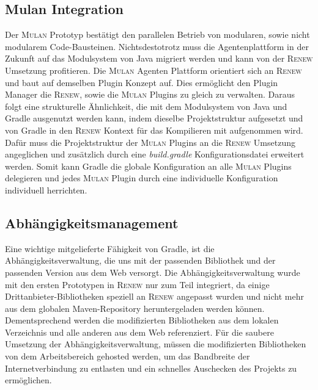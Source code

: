  \subsection*{Mulan Integration}
	Der \textsc{Mulan} Prototyp bestätigt den parallelen Betrieb von modularen, sowie nicht modularem Code-Bausteinen. Nichtsdestotrotz muss die Agentenplattform in der Zukunft auf das Modulsystem von Java migriert werden und kann von der \textsc{Renew} Umsetzung profitieren.\newline
	Die \textsc{Mulan} Agenten Plattform orientiert sich an \textsc{Renew} und baut auf demselben Plugin Konzept auf. Dies ermöglicht den Plugin Manager die \textsc{Renew}, sowie die \textsc{Mulan} Plugins zu gleich zu verwalten. Daraus folgt eine strukturelle Ähnlichkeit, die mit dem Modulsystem von Java und Gradle ausgenutzt werden kann, indem dieselbe Projektstruktur aufgesetzt und von Gradle in den \textsc{Renew} Kontext für das Kompilieren mit aufgenommen wird.\newline
	Dafür muss die Projektstruktur der \textsc{Mulan} Plugins an die \textsc{Renew} Umsetzung angeglichen und zusätzlich durch eine \textit{build.gradle} Konfigurationsdatei erweitert werden. Somit kann Gradle die globale Konfiguration an alle \textsc{Mulan} Plugins delegieren und jedes \textsc{Mulan} Plugin durch eine individuelle Konfiguration individuell herrichten. 
		
 \subsection*{Abhängigkeitsmanagement}
	Eine wichtige mitgelieferte Fähigkeit von Gradle, ist die Abhängigkeitsverwaltung, die uns mit der passenden Bibliothek und der passenden Version aus dem Web versorgt. Die Abhängigkeitsverwaltung wurde mit den ersten Prototypen in \textsc{Renew} nur zum Teil integriert, da einige Drittanbieter-Bibliotheken speziell an \textsc{Renew} angepasst wurden und nicht mehr aus dem globalen Maven-Repository heruntergeladen werden können. Dementsprechend werden die modifizierten Bibliotheken aus dem lokalen Verzeichnis und alle anderen aus dem Web referenziert.\newline
	Für die saubere Umsetzung der Abhängigkeitsverwaltung, müssen die modifizierten Bibliotheken von dem Arbeitsbereich gehosted werden, um das Bandbreite der Internetverbindung zu entlasten und ein schnelles Auschecken des Projekts zu ermöglichen. 	
	
